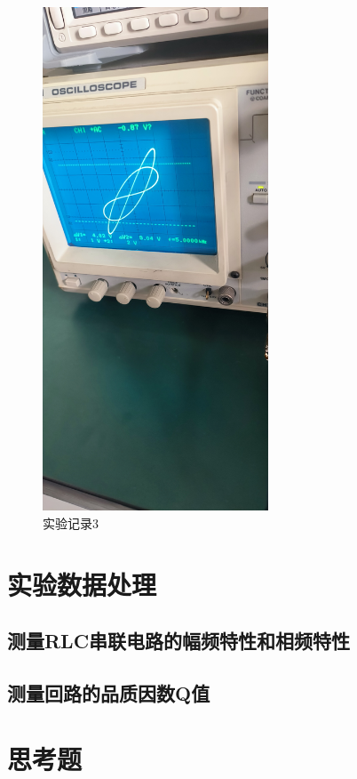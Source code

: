 \documentclass{ctexart}
\begin{document}
\begin{figure}[H]
  \centering
  \includegraphics[width=0.6\textwidth,height=0.3\textheight]{shiyanjilu3.jpg}
  \caption{实验记录3}
\end{figure}
\newpage

\section{实验数据处理}
  \subsection{测量RLC串联电路的幅频特性和相频特性}
  \subsection{测量回路的品质因数Q值}

\section{思考题}
\end{document}

